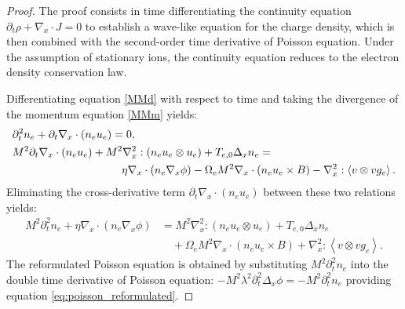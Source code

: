 \documentclass[pdflatex,final,10pt]{article}
\newcommand{\Fabrice}[1]{#1}
\begin{document}
\begin{proof} \label{prop2.2pf}
The proof consists in time differentiating the continuity equation $\partial_t \rho + \nabla_x \cdot J=0$ to establish a wave-like equation for the charge density, which is then combined with the second-order time derivative of Poisson equation. Under the assumption of stationary ions, the continuity equation reduces to the electron density conservation law.

Differentiating equation \eqref{MMd} with respect to time and taking the divergence of the momentum equation \eqref{MMm} yields:
\begin{align*}
        &\partial_t^2n_e + \partial_t\nabla_x\cdot(n_eu_e) = 0, \\
        &M^2\partial_t\nabla_x\cdot(n_eu_e) + M^2\nabla_x^2:(n_eu_e\otimes u_e)+T_{e,0}\Fabrice{\Delta_x}n_e  = \\
        & \hspace{3.5cm} \Fabrice{\eta} \nabla_x\cdot(n_e\nabla_x\phi)\Fabrice{ - \Omega_e M^2 \nabla_x \cdot (n_e u_e \times B )}-\nabla_x^2:\left< v\otimes vg_e \right>.
\end{align*}
Eliminating the cross-derivative term $\partial_t\nabla_x\cdot(n_eu_e)$ between these two relations yields:
\begin{equation} \label{eq:wave_ne}
    \begin{split}
        M^2\partial_t^2n_e + \Fabrice{\eta}\nabla_x\cdot(n_e\nabla_x\phi) &= M^2\nabla_x^2:(n_eu_e\otimes u_e)+T_{e,0}\Fabrice{\Delta_x}n_e \\
        &\quad\Fabrice{ + \Omega_e M^2 \nabla_x \cdot (n_e u_e \times B )} + \nabla_x^2:\left< v\otimes vg_e \right>.
    \end{split}
\end{equation}
The reformulated Poisson equation is obtained by substituting $M^2\partial_t^2n_e$ into the double time derivative of Poisson equation: $-M^2 \lambda^2 \partial_t^2 \Delta_x \phi = -M^2 \partial_t^2 n_e$ providing equation \eqref{eq:poisson_reformulated}.


\end{proof}
\end{document}
